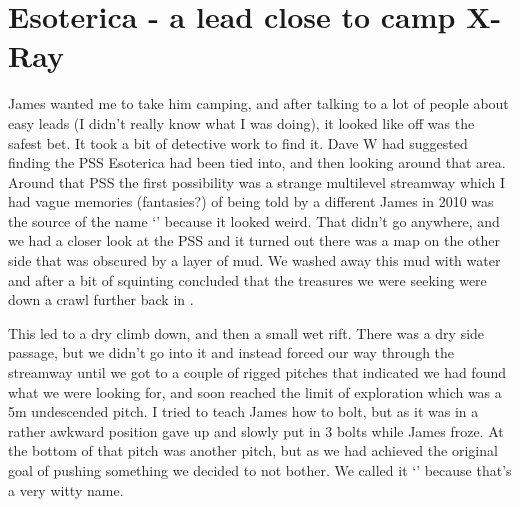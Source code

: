 \section{Esoterica - a lead close to camp X-Ray}
\begin{marginfigure}
\end{marginfigure}

James wanted me to take him camping, and after talking to a lot of people about easy leads (I didn't really know what I was doing), it looked like  off  was the safest bet. It took a bit of detective work to find it. Dave W had suggested finding the PSS Esoterica had been tied into, and then looking around that area. Around that PSS the first possibility was a strange multilevel streamway which I had vague memories (fantasies?) of being told by a different James in 2010 was the source of the name `' because it looked weird. That didn't go anywhere, and we had a closer look at the PSS and it turned out there was a map on the other side that was obscured by a layer of mud. We washed away this mud with water and after a bit of squinting concluded that the treasures we were seeking were down a crawl further back in . 

This led to a dry climb down, and then a small wet rift. There was a dry side passage, but we didn't go into it and instead forced our way through the streamway until we got to a couple of rigged pitches that indicated we had found what we were looking for, and soon reached the limit of exploration which was a 5m undescended pitch. I tried to teach James how to bolt, but as it was in a rather awkward position gave up and slowly put in 3 bolts while James froze. At the bottom of that pitch was another pitch, but as we had achieved the original goal of pushing something we decided to not bother. We called it `' because that's a very witty name. 

